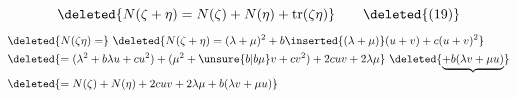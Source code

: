 \[
\deleted{N(\zeta+\eta)=N(\zeta)+N(\eta)+\operatorname{tr}(\zeta\eta)}\tag*{\deleted{(19)}}
\]
\[
\begin{aligned}
&\deleted{N(\zeta\eta)=}\ \deleted{N(\zeta+\eta)=(\lambda+\mu)^2+b\inserted{(\lambda+\mu)}(u+v)+c(u+v)^2}\\
&\deleted{=(\lambda^2+b\lambda u+cu^2)+(\mu^2+\unsure{b|b\mu}v+cv^2)+2cuv+2\lambda\mu}
 \ \deleted{\underbrace{+b(\lambda v+\mu u)}}\\
&\deleted{=N(\zeta)+N(\eta)+2cuv+2\lambda\mu+b(\lambda v+\mu u)}
\end{aligned}
\]


